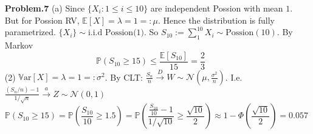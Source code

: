 \documentclass[a4paper, 11pt]{article}
\begin{document}
\begin{itemize}
	\item[\textbf{Problem.7}] (a) Since $\{X_i: 1\leq i\leq 10\}$ are independent Possion with mean $1$. But for Possion RV, $\mathbb{E}\left[X\right]=\lambda=1=:\mu$. Hence the distribution is fully parametrized. $\{X_i\}\sim \text{i.i.d~Possion(1)}$. So $S_{10}:=\sum_{1}^{10} X_i\sim \text{Possion}(10)$. By Markov
	\begin{equation}
		\mathbb{P}\left(S_{10}\geq 15\right) \leq \frac{\mathbb{E}\left[S_{10}\right]}{15}=\frac{2}{3}
	\end{equation}
	(2) $\mathrm{\mathbb{V}ar}\left[X\right]=\lambda=1=:\sigma^2$. By CLT: $\frac{S_n}{n} \xrightarrow{D} W\sim\mathcal{N}(\mu, \frac{\sigma^2}{n})$. I.e. $\frac{(S_n/n)-1}{1/\sqrt{n}}\xrightarrow{a}Z\sim \mathcal{N}(0,1)$
	\begin{equation}
		\mathbb{P}\left(S_{10} \geq 15\right) = \mathbb{P}\left(\frac{S_{10}}{10}\geq 1.5\right) = \mathbb{P}\left(\frac{\frac{S_{10}}{10}-1}{1/\sqrt{10}}\geq \frac{\sqrt{10}}{2}\right) \approx 1-\Phi\left(\frac{\sqrt{10}}{2}\right)=0.057
	\end{equation}
\end{itemize}
\end{document}
